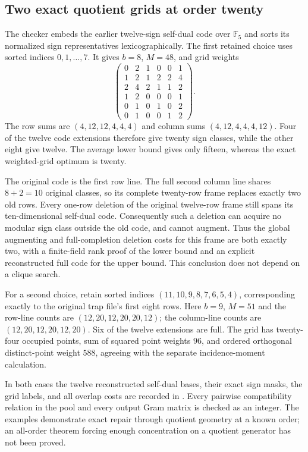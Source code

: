 \documentclass[11pt]{article}
\begin{document}
\subsection{Two exact quotient grids at order twenty}
The checker embeds the earlier twelve-sign self-dual code over
$\mathbb F_5$ and sorts its normalized sign representatives
lexicographically. The first retained choice uses sorted indices
$0,1,\ldots,7$. It gives $b=8$, $M=48$, and grid weights
\[
\begin{pmatrix}
0&2&1&0&0&1\\1&2&1&2&2&4\\2&4&2&1&1&2\\
1&2&0&0&0&1\\0&1&0&1&0&2\\0&1&0&0&1&2
\end{pmatrix}.
\]
The row sums are $(4,12,12,4,4,4)$ and column sums
$(4,12,4,4,4,12)$. Four of the twelve code extensions therefore
give twenty sign classes, while the other eight give twelve.
The average lower bound gives only fifteen, whereas the exact
weighted-grid optimum is twenty.

The original code is the first row line. The full second column
line shares $8+2=10$ original classes, so its complete twenty-row
frame replaces exactly two old rows. Every one-row deletion of
the original twelve-row frame still spans its ten-dimensional
self-dual code. Consequently such a deletion can acquire no modular
sign class outside the old code, and cannot augment. Thus the
global augmenting and full-completion deletion costs for this
frame are both exactly two, with a finite-field rank proof of
the lower bound and an explicit reconstructed full code for the
upper bound. This conclusion does not depend on a clique search.

For a second choice, retain sorted indices
$(11,10,9,8,7,6,5,4)$, corresponding exactly to the original trap
file's first eight rows. Here $b=9$, $M=51$ and the row-line counts
are $(12,20,12,20,20,12)$; the column-line counts are
$(12,20,12,20,12,20)$. Six of the twelve extensions are full.
The grid has twenty-four occupied points, sum of squared point
weights $96$, and ordered orthogonal distinct-point weight $588$,
agreeing with the separate incidence-moment calculation.

In both cases the twelve reconstructed self-dual bases, their exact
sign masks, the grid labels, and all overlap costs are recorded in
. Every pairwise compatibility relation
in the pool and every output Gram matrix is checked as an integer.
The examples demonstrate exact repair through quotient geometry at
a known order; an all-order theorem forcing enough concentration
on a quotient generator has not been proved.
\end{document}
